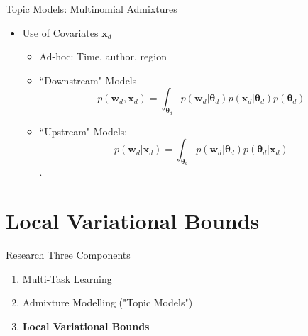 \documentclass[xcolor=dvipsnames]{beamer}
\newcommand \vv[1] { \boldsymbol #1 }
\newcommand \wdoc      { { \vv{w}_d } }
\newcommand \thd[0]  { { \vv \theta_d } }
\newcommand \xd      { { \vv x_d } }
\begin{document}
\begin{frame}{Topic Models: Multinomial Admixtures}
\begin{itemize}
    \item<5-> Use of Covariates $\vv{x}_d$
     { \begin{itemize}
        \item Ad-hoc: Time\cite{Wang2006}, author\cite{MacCallum2007}, region\cite{Eisenstein2010}
        \item ``Downstream" Models\cite{Blei2003}\cite{Salomatin2009}\cite{Virtanen2012a} \begin{equation} p(\wdoc,\xd) = \int_{\thd} p(\wdoc|\thd) p(\xd|\thd) p(\thd)\end{equation}
        \item ``Upstream" Models:\cite{Mimno2008} \begin{equation}p(\wdoc | \xd) = \int_{\thd} p(\wdoc|\thd) p(\thd|\xd)\end{equation}.
    \end{itemize} 
    }
    
    
\end{itemize}


\end{frame}

\section{Local Variational Bounds}

\begin{frame}{Research}
Three Components


    \begin{enumerate}
        \item { \color{gray} Multi-Task Learning }
        \item { \color{gray} Admixture Modelling ("Topic Models")}
        \item { \bf Local Variational Bounds}
    \end{enumerate}


\end{frame}


\end{document}
